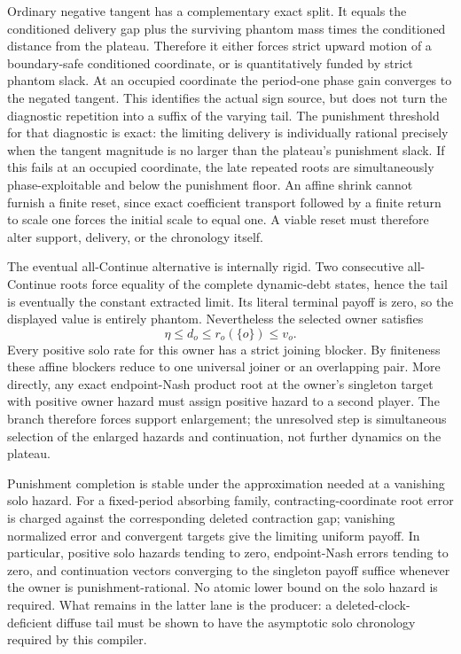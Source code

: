 \documentclass[11pt]{article}
\begin{document}
Ordinary negative tangent has a complementary exact split.  It equals the
conditioned delivery gap plus the surviving phantom mass times the conditioned
distance from the plateau.  Therefore it either forces strict upward motion of
a boundary-safe conditioned coordinate, or is quantitatively funded by strict
phantom slack.  At an occupied coordinate the period-one phase gain converges
to the negated tangent.  This identifies the actual sign source, but does not
turn the diagnostic repetition into a suffix of the varying tail.
The punishment threshold for that diagnostic is exact: the limiting delivery
is individually rational precisely when the tangent magnitude is no larger
than the plateau's punishment slack.  If this fails at an occupied coordinate,
the late repeated roots are simultaneously phase-exploitable and below the
punishment floor.  An affine shrink cannot furnish a finite reset, since exact
coefficient transport followed by a finite return to scale one forces the
initial scale to equal one.  A viable reset must therefore alter support,
delivery, or the chronology itself.

The eventual all-Continue alternative is internally rigid.  Two consecutive
all-Continue roots force equality of the complete dynamic-debt states, hence
the tail is eventually the constant extracted limit.  Its literal terminal
payoff is zero, so the displayed value is entirely phantom.  Nevertheless the
selected owner satisfies
\[
 \eta\leq d_o\leq r_o(\{o\})\leq v_o.
\]
Every positive solo rate for this owner has a strict joining blocker.  By
finiteness these affine blockers reduce to one universal joiner or an
overlapping pair.  More directly, any exact endpoint-Nash product root at the
owner's singleton target with positive owner hazard must assign positive
hazard to a second player.  The branch therefore forces support enlargement;
the unresolved step is simultaneous selection of the enlarged hazards and
continuation, not further dynamics on the plateau.

Punishment completion is stable under the approximation needed at a vanishing
solo hazard.  For a fixed-period absorbing family, contracting-coordinate
root error is charged against the corresponding deleted contraction gap;
vanishing normalized error and convergent targets give the limiting uniform
payoff.  In particular, positive solo hazards tending to zero, endpoint-Nash
errors tending to zero, and continuation vectors converging to the singleton
payoff suffice whenever the owner is punishment-rational.  No atomic lower
bound on the solo hazard is required.  What remains in the latter lane is the
producer: a deleted-clock-deficient diffuse tail must be shown to have the
asymptotic solo chronology required by this compiler.
\end{document}

